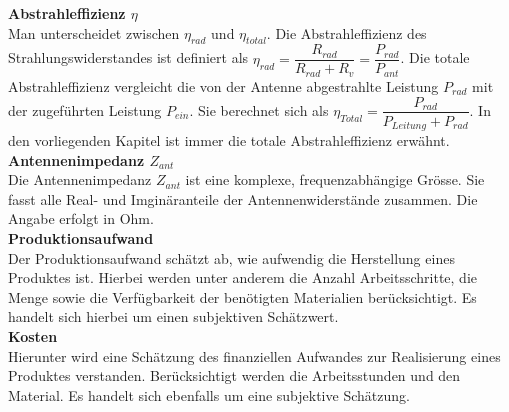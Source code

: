 \textbf{Abstrahleffizienz $\eta$}\\
Man unterscheidet zwischen $\eta_{rad}$ und $\eta_{total}$. Die Abstrahleffizienz des Strahlungswiderstandes ist definiert als $\eta_{rad}=\dfrac{R_{rad}}{R_{rad}+R_v}=\dfrac{P_{rad}}{P_{ant}}$. Die totale Abstrahleffizienz vergleicht die von der Antenne abgestrahlte Leistung $P_{rad}$ mit der zugeführten Leistung $P_{ein}$. Sie berechnet sich als $\eta_{Total}=\dfrac{P_{rad}}{P_{Leitung}+P_{rad}}$. In den vorliegenden Kapitel ist immer die totale Abstrahleffizienz erwähnt.\\

\textbf{Antennenimpedanz $Z_{ant}$}\\
Die Antennenimpedanz $Z_{ant}$ ist eine komplexe, frequenzabhängige  Grösse. Sie fasst alle Real- und Imginäranteile der Antennenwiderstände zusammen. Die Angabe erfolgt in Ohm.\\

\textbf{Produktionsaufwand}\\
Der Produktionsaufwand schätzt ab, wie aufwendig die Herstellung eines Produktes ist. Hierbei werden unter anderem die Anzahl Arbeitsschritte, die Menge sowie die Verfügbarkeit der benötigten Materialien berücksichtigt. Es handelt sich hierbei um einen subjektiven Schätzwert.\\

\textbf{Kosten}\\
Hierunter wird eine Schätzung des finanziellen Aufwandes zur Realisierung eines Produktes verstanden. Berücksichtigt werden die Arbeitsstunden und den Material. Es handelt sich ebenfalls um eine subjektive Schätzung.  
\newpage 
\thispagestyle{empty}

